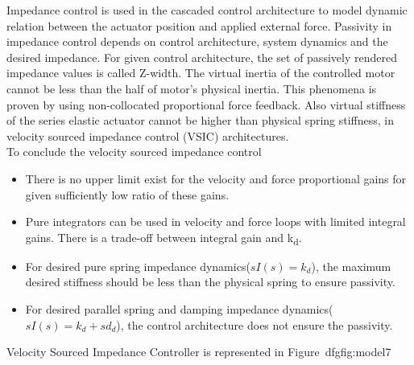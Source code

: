 \documentclass{article}
\begin{document}
Impedance control is used in the cascaded control architecture to model dynamic relation between the actuator position and applied external force. Passivity in impedance control depends on control architecture, system dynamics and the desired impedance. For given control architecture, the set of passively rendered impedance values is called Z-width\cite{adamsblake}. The virtual inertia of the controlled motor cannot be less than the half of motor's physical inertia. This phenomena is proven by using non-collocated proportional force feedback\cite{colgate}. Also virtual stiffness of the series elastic actuator cannot be higher than physical spring stiffness, in velocity sourced impedance control (VSIC) architectures\cite{vallery}.\\

To conclude the velocity sourced impedance control\cite{calanca}
\begin{itemize}
	\item There is no upper limit exist for the velocity and force proportional gains for given sufficiently low ratio of these gains.
	\item Pure integrators can be used in velocity and force loops with limited integral gains. There is a trade-off between integral gain and k\textsubscript{d}.
	\item For desired pure spring impedance dynamics(\(sI(s)=k_d\)), the maximum desired stiffness should be less than the physical spring to ensure passivity.
	\item For desired parallel spring and damping impedance dynamics(\(sI(s)=k_d+sd_d\)), the control architecture does not ensure the passivity\cite{tagliamonte}.
\end{itemize}
Velocity Sourced Impedance Controller is represented in Figure~dfgfig:model7
\end{document}
